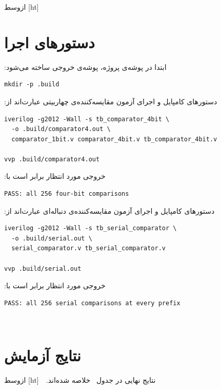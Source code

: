 ‫
‫[ht]
‫‌ازوسط
‫
‫
‫
‫
‫
‫
‫\section{دستورهای اجرا}
‫
‫ابتدا در پوشه‌ی پروژه، پوشه‌ی خروجی ساخته می‌شود:
‫
\begin{dsdlcodeblock}
\begin{verbatim}
mkdir -p .build
\end{verbatim}
\end{dsdlcodeblock}
‫
‫دستورهای کامپایل و اجرای آزمون مقایسه‌کننده‌ی چهاربیتی عبارت‌اند از:
‫
\begin{dsdlcodeblock}
\begin{verbatim}
iverilog -g2012 -Wall -s tb_comparator_4bit \
  -o .build/comparator4.out \
  comparator_1bit.v comparator_4bit.v tb_comparator_4bit.v

vvp .build/comparator4.out
\end{verbatim}
\end{dsdlcodeblock}
‫
‫خروجی مورد انتظار برابر است با:
‫
\begin{dsdlcodeblock}
\begin{verbatim}
PASS: all 256 four-bit comparisons
\end{verbatim}
\end{dsdlcodeblock}
‫
‫دستورهای کامپایل و اجرای آزمون مقایسه‌کننده‌ی دنباله‌ای عبارت‌اند از:
‫
\begin{dsdlcodeblock}
\begin{verbatim}
iverilog -g2012 -Wall -s tb_serial_comparator \
  -o .build/serial.out \
  serial_comparator.v tb_serial_comparator.v

vvp .build/serial.out
\end{verbatim}
\end{dsdlcodeblock}
‫
‫خروجی مورد انتظار برابر است با:
‫
\begin{dsdlcodeblock}
\begin{verbatim}
PASS: all 256 serial comparisons at every prefix
\end{verbatim}
\end{dsdlcodeblock}
‫
‫
‫\section{نتایج آزمایش}
‫
‫نتایج نهایی در جدول~ خلاصه شده‌اند.
‫
‫
‫[ht]
‫\تنظیم‌ازوسط
‫
‫
‫

